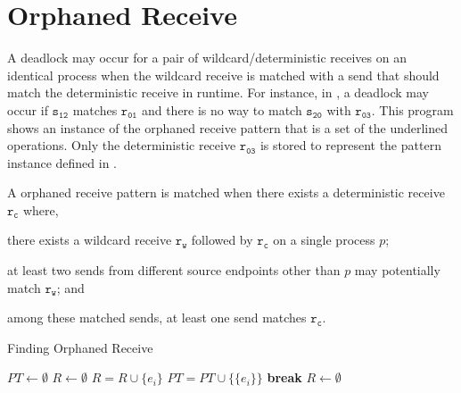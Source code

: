 \section{Orphaned Receive}


A deadlock may occur for a pair of wildcard/deterministic receives on an identical process when the wildcard receive is matched with a send that should match the deterministic receive in runtime. For instance, in , a deadlock may occur if $\mathtt{s_{12}}$ matches $\mathtt{r_{01}}$ and there is no way to match $\mathtt{s_{20}}$ with $\mathtt{r_{03}}$. This program shows an instance of the orphaned receive pattern that is a set of the underlined operations. Only the deterministic receive $\mathtt{r_{03}}$ is stored to represent the pattern instance defined in .


\begin{definition}
A orphaned receive pattern is matched when there exists a deterministic receive $\mathtt{r_c}$ where, 
\begin{compactenum}
\item there exists a wildcard receive $\mathtt{r_w}$ followed by $\mathtt{r_c}$ on a single process $\mathit{p}$; 
\item at least two sends from different source endpoints other than $\mathit{p}$ may potentially match $\mathtt{r_w}$; and
\item among these matched sends, at least one send matches $\mathtt{r_c}$. 
\end{compactenum}
\label{def:mismatch}
\end{definition}


\begin{algorithm}
\caption{Finding Orphaned Receive}\label{algo:mismatch}
\begin{algorithmic}[1]
\State $\mathit{PT} \gets \emptyset$
\State $\mathit{R} \gets \emptyset$
\State $\mathit{R} = \mathit{R} \cup \{e_i\}$
\EndIf
{}
\State $\mathit{PT} = \mathit{PT} \cup \{\{e_i\}\}$
\State \textbf{break}
\EndIf
\EndFor
\EndIf
\EndFor
\State $\mathit{R} \gets \emptyset$
\EndFor
\end{algorithmic}
\end{algorithm}

